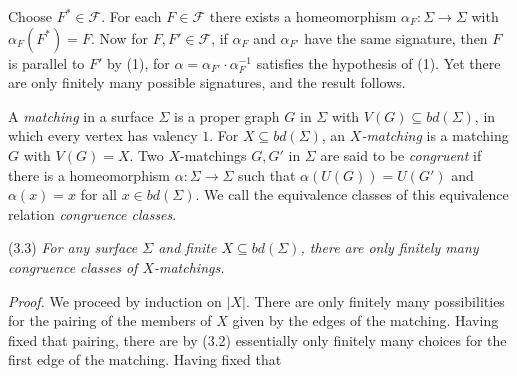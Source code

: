Choose $F^* \in \mathcal{F}$. For each $F \in \mathcal{F}$ there exists a homeomorphism $\alpha_F \colon \Sigma \to \Sigma$ with $\alpha_F(F^*) = F$. Now for $F, F' \in \mathcal{F}$, if $\alpha_F$ and $\alpha_{F'}$ have the same signature, then $F$ is parallel to $F'$ by (1), for $\alpha = \alpha_{F'} \cdot \alpha_F^{-1}$ satisfies the hypothesis of (1). Yet there are only finitely many possible signatures, and the result follows.

A \textit{matching} in a surface $\Sigma$ is a proper graph $G$ in $\Sigma$ with $V(G) \subseteq bd(\Sigma)$, in which every vertex has valency $1$. For $X \subseteq bd(\Sigma)$, an \textit{$X$-matching} is a matching $G$ with $V(G) = X$. Two $X$-matchings $G, G'$ in $\Sigma$ are said to be \textit{congruent} if there is a homeomorphism $\alpha \colon \Sigma \to \Sigma$ such that $\alpha(U(G)) = U(G')$ and $\alpha(x) = x$ for all $x \in bd(\Sigma)$. We call the equivalence classes of this equivalence relation \textit{congruence classes}.

\stmt
(3.3) \textit{For any surface $\Sigma$ and finite $X \subseteq bd(\Sigma)$, there are only finitely many congruence classes of $X$-matchings.}

\textit{Proof.} We proceed by induction on $|X|$. There are only finitely many possibilities for the pairing of the members of $X$ given by the edges of the matching. Having fixed that pairing, there are by (3.2) essentially only finitely many choices for the first edge of the matching. Having fixed that
